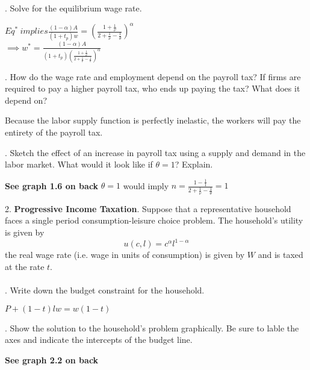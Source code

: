 \documentclass[11pt]{SelfArxOneColBMN}
\begin{document}
. Solve for the equilibrium wage rate.
	\begin{solution}
		$Eq^* \ implies \frac{(1 - \alpha)A}{(1 + t_p)w} = (\frac{1 + \frac{1}{\nu}}{2 + \frac{1}{\nu} - \frac{1}{\theta}})^\alpha$\\
		$\implies w^* = \frac{(1 - \alpha)A}{(1 + t_p)(\frac{1 + \frac{1}{\nu}}{2 + \frac{1}{\nu} - \frac{1}{\theta}})^\alpha}$
	\end{solution}
. How do the wage rate and employment depend on the payroll tax? If firms are required to pay a higher payroll tax, who ends up paying the tax? What does it depend on?
	\begin{solution}
		Because the labor supply function is perfectly inelastic, the workers will pay the entirety of the payroll tax.
	\end{solution}
. Sketch the effect of an increase in payroll tax using a supply and demand in the labor market. What would it look like if $\theta = 1$? Explain.
	\begin{solution}
		\textbf{See graph 1.6 on back}
		$\theta = 1$ would imply $n = \frac{1 - \frac{1}{1}}{2 + \frac{1}{\nu} - \frac{1}{\theta}} = 1$
	\end{solution}
2. \textbf{Progressive Income Taxation}. Suppose that a representative household faces a single period consumption-leisure choice problem. The household's utility is given by
\begin{equation}
	u(c,l) = c^\alpha l^{1 - \alpha}
\end{equation}
the real wage rate (i.e. wage in units of consumption) is given by $W$ and is taxed at the rate $t$.\\
\\
. Write down the budget constraint for the household.
	\begin{solution}
		$P + (1 - t)lw = w(1 - t)$
	\end{solution}

. Show the solution to the household's problem graphically. Be sure to lable the axes and indicate the intercepts of the budget line.
	\begin{solution}
		\textbf{See graph 2.2 on back}
	\end{solution}
\end{document}
